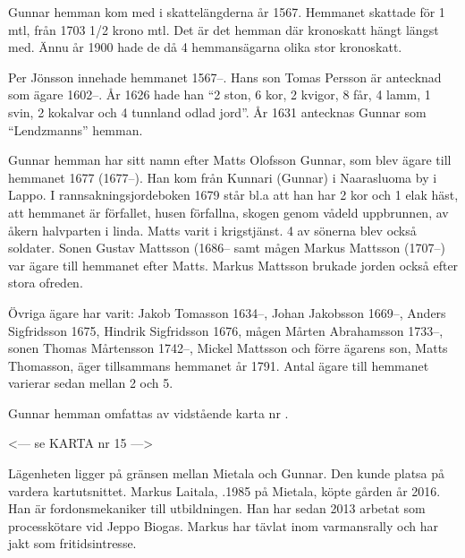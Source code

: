
Gunnar hemman kom med i skattelängderna år 1567. Hemmanet skattade för 1 mtl, från 1703  1/2 krono mtl. Det är det hemman där kronoskatt hängt längst med. Ännu år 1900 hade de då 4 hemmansägarna olika stor kronoskatt.

Per Jönsson innehade hemmanet 1567--. Hans son Tomas Persson är antecknad som ägare 1602--. År 1626 hade han ``2 ston, 6 kor, 2 kvigor, 8 får, 4 lamm, 1 svin, 2 kokalvar och 4 tunnland odlad jord''. År 1631 antecknas Gunnar som ``Lendzmanns'' hemman.

Gunnar hemman har sitt namn efter Matts Olofsson Gunnar, som blev ägare till hemmanet 1677 (1677--). Han kom från Kunnari (Gunnar) i Naarasluoma by i Lappo. I rannsakningsjordeboken 1679 står bl.a att han har 2 kor och 1 elak häst, att hemmanet är förfallet, husen förfallna, skogen genom vådeld uppbrunnen, av åkern halvparten i linda. Matts varit i krigstjänst. 4 av sönerna blev också soldater. Sonen Gustav Mattsson (1686-- samt mågen Markus Mattsson (1707--) var ägare till hemmanet efter Matts. Markus Mattsson brukade jorden också efter stora ofreden.

Övriga ägare har varit: Jakob Tomasson 1634--, Johan Jakobsson 1669--, Anders Sigfridsson 1675,  Hindrik Sigfridsson 1676,  mågen Mårten Abrahamsson 1733--, sonen Thomas Mårtensson 1742--, Mickel Mattsson och förre ägarens son, Matts Thomasson, äger tillsammans hemmanet år 1791. Antal ägare till hemmanet varierar sedan mellan 2 och 5.


Gunnar hemman omfattas av vidstående karta nr .


<--- se KARTA nr 15 --->







Lägenheten ligger på gränsen mellan Mietala och Gunnar. Den kunde platsa på vardera kartutsnittet. Markus Laitala, .1985 på Mietala, köpte gården år 2016. Han är fordonsmekaniker till utbildningen. Han har sedan 2013 arbetat som processkötare vid Jeppo Biogas. Markus har tävlat inom varmansrally och har jakt som fritidsintresse.\jhvspace{}


